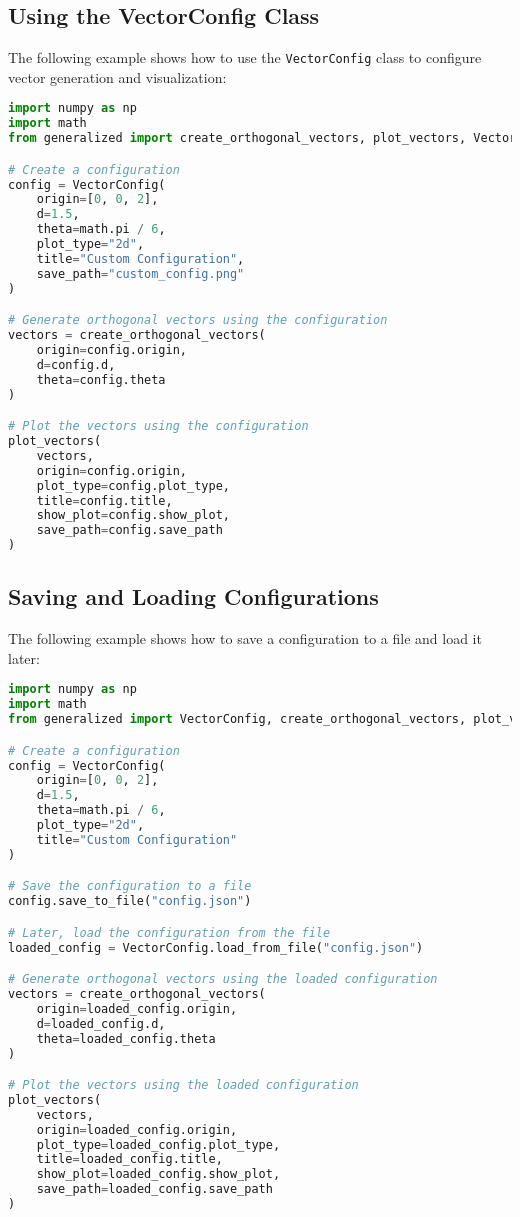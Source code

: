 \subsection{Using the VectorConfig Class}

The following example shows how to use the \texttt{VectorConfig} class to configure vector generation and visualization:

\begin{lstlisting}[language=Python]
import numpy as np
import math
from generalized import create_orthogonal_vectors, plot_vectors, VectorConfig

# Create a configuration
config = VectorConfig(
    origin=[0, 0, 2],
    d=1.5,
    theta=math.pi / 6,
    plot_type="2d",
    title="Custom Configuration",
    save_path="custom_config.png"
)

# Generate orthogonal vectors using the configuration
vectors = create_orthogonal_vectors(
    origin=config.origin,
    d=config.d,
    theta=config.theta
)

# Plot the vectors using the configuration
plot_vectors(
    vectors,
    origin=config.origin,
    plot_type=config.plot_type,
    title=config.title,
    show_plot=config.show_plot,
    save_path=config.save_path
)
\end{lstlisting}

\subsection{Saving and Loading Configurations}

The following example shows how to save a configuration to a file and load it later:

\begin{lstlisting}[language=Python]
import numpy as np
import math
from generalized import VectorConfig, create_orthogonal_vectors, plot_vectors

# Create a configuration
config = VectorConfig(
    origin=[0, 0, 2],
    d=1.5,
    theta=math.pi / 6,
    plot_type="2d",
    title="Custom Configuration"
)

# Save the configuration to a file
config.save_to_file("config.json")

# Later, load the configuration from the file
loaded_config = VectorConfig.load_from_file("config.json")

# Generate orthogonal vectors using the loaded configuration
vectors = create_orthogonal_vectors(
    origin=loaded_config.origin,
    d=loaded_config.d,
    theta=loaded_config.theta
)

# Plot the vectors using the loaded configuration
plot_vectors(
    vectors,
    origin=loaded_config.origin,
    plot_type=loaded_config.plot_type,
    title=loaded_config.title,
    show_plot=loaded_config.show_plot,
    save_path=loaded_config.save_path
)
\end{lstlisting}

